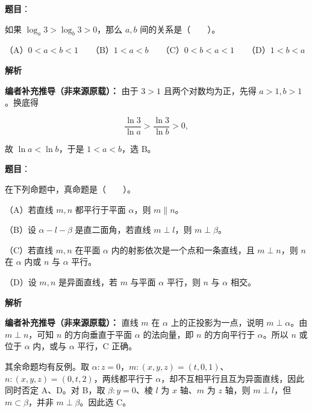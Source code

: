 \begin{answer}

\textbf{题目}：

如果 $\log_a3>\log_b3>0$，那么 $a,b$ 间的关系是\mbox{（　　）}。

（A）$0<a<b<1$　　（B）$1<a<b$　　（C）$0<b<a<1$　　（D）$1<b<a$

\textbf{解析}

\textbf{编者补充推导（非来源原载）：} 由于 $3>1$ 且两个对数均为正，先得 $a>1,b>1$。换底得

\nopagebreak[4]
\[\frac{\ln3}{\ln a}>\frac{\ln3}{\ln b}>0,\]

故 $\ln a<\ln b$，于是 $1<a<b$，选 B。


\end{answer}
\begin{answer}

\textbf{题目}：

在下列命题中，真命题是\mbox{（　　）}。

（A）若直线 $m,n$ 都平行于平面 $\alpha$，则 $m\parallel n$。

（B）设 $\alpha-l-\beta$ 是直二面角，若直线 $m\perp l$，则 $m\perp\beta$。

（C）若直线 $m,n$ 在平面 $\alpha$ 内的射影依次是一个点和一条直线，且 $m\perp n$，则 $n$ 在 $\alpha$ 内或 $n$ 与 $\alpha$ 平行。

（D）设 $m,n$ 是异面直线，若 $m$ 与平面 $\alpha$ 平行，则 $n$ 与 $\alpha$ 相交。

\textbf{解析}

\textbf{编者补充推导（非来源原载）：} 直线 $m$ 在 $\alpha$ 上的正投影为一点，说明 $m\perp\alpha$。由 $m\perp n$，可知 $n$ 的方向垂直于平面 $\alpha$ 的法向量，即 $n$ 的方向平行于 $\alpha$。所以 $n$ 或位于 $\alpha$ 内，或与 $\alpha$ 平行，C 正确。

其余命题均有反例。取 $\alpha:z=0$，$m:(x,y,z)=(t,0,1)$、$n:(x,y,z)=(0,t,2)$，两线都平行于 $\alpha$，却不互相平行且互为异面直线，因此同时否定 A、D。对 B，取 $\beta:y=0$、棱 $l$ 为 $x$ 轴、$m$ 为 $z$ 轴，则 $m\perp l$，但 $m\subset\beta$，并非 $m\perp\beta$。因此选 C。


\end{answer}
